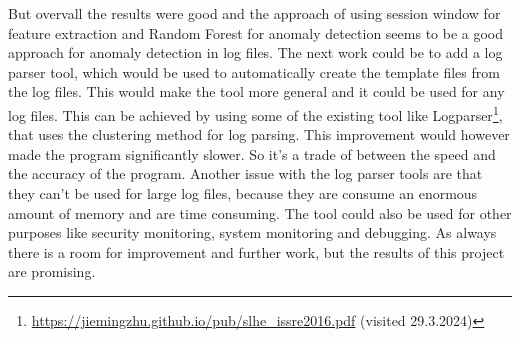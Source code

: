 But overvall the results were good and the approach of using session window for feature extraction and Random Forest for anomaly detection seems to be a good approach for anomaly detection in log files.
The next work could be to add a log parser tool, which would be used to automatically create the template files from the log files. This would make the tool more general and it could be used for any log files.
This can be achieved by using some of the existing tool like Logparser\footnote{\url{https://jiemingzhu.github.io/pub/slhe_issre2016.pdf} (visited 29.3.2024)}, that uses the clustering method for log parsing.
This improvement would however made the program significantly slower. So it's a trade of between the speed and the accuracy of the program. Another issue with the log parser tools are that they 
can't be used for large log files, because they are consume an enormous amount of memory and are time consuming. 
The tool could also be used for other purposes like security monitoring, system monitoring and debugging. As always there is a room for 
improvement and further work, but the results of this project are promising.


% 